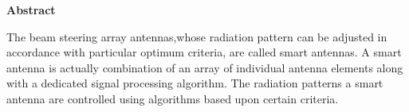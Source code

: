 \begin{center}
{\Large \bf Abstract}\\
\end{center}
The beam steering array antennas,whose radiation pattern can be adjusted in accordance with particular optimum criteria, are called smart antennas. A smart antenna is actually combination of an array of individual antenna elements along with a dedicated signal processing algorithm. The radiation patterns a smart antenna are controlled using algorithms based upon certain criteria. 